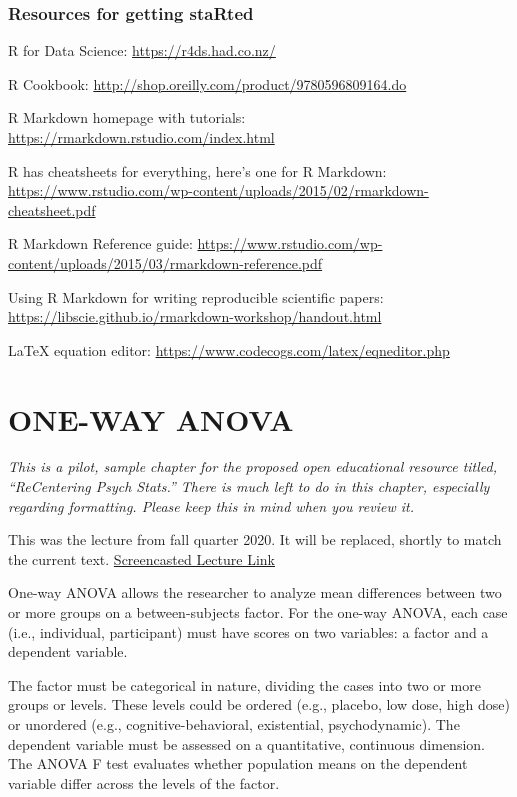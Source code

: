 \documentclass[
  english,
]{book}
\begin{document}
\hypertarget{resources-for-getting-started}{%
\subsection{Resources for getting staRted}\label{resources-for-getting-started}}

R for Data Science: \url{https://r4ds.had.co.nz/}

R Cookbook: \url{http://shop.oreilly.com/product/9780596809164.do}

R Markdown homepage with tutorials: \url{https://rmarkdown.rstudio.com/index.html}

R has cheatsheets for everything, here's one for R Markdown: \url{https://www.rstudio.com/wp-content/uploads/2015/02/rmarkdown-cheatsheet.pdf}

R Markdown Reference guide: \url{https://www.rstudio.com/wp-content/uploads/2015/03/rmarkdown-reference.pdf}

Using R Markdown for writing reproducible scientific papers: \url{https://libscie.github.io/rmarkdown-workshop/handout.html}

LaTeX equation editor: \url{https://www.codecogs.com/latex/eqneditor.php}

\hypertarget{oneway}{%
\chapter{ONE-WAY ANOVA}\label{oneway}}

\emph{This is a pilot, sample chapter for the proposed open educational resource titled, ``ReCentering Psych Stats.'' There is much left to do in this chapter, especially regarding formatting. Please keep this in mind when you review it.}

This was the lecture from fall quarter 2020. It will be replaced, shortly to match the current text. \href{https://spu.hosted.panopto.com/Panopto/Pages/Viewer.aspx?pid=150b68bf-c880-4348-8114-acb7000b227e}{Screencasted Lecture Link}

One-way ANOVA allows the researcher to analyze mean differences between two or more groups on a between-subjects factor. For the one-way ANOVA, each case (i.e., individual, participant) must have scores on two variables: a factor and a dependent variable.

The factor must be categorical in nature, dividing the cases into two or more groups or levels. These levels could be ordered (e.g., placebo, low dose, high dose) or unordered (e.g., cognitive-behavioral, existential, psychodynamic). The dependent variable must be assessed on a quantitative, continuous dimension. The ANOVA F test evaluates whether population means on the dependent variable differ across the levels of the factor.
\end{document}
